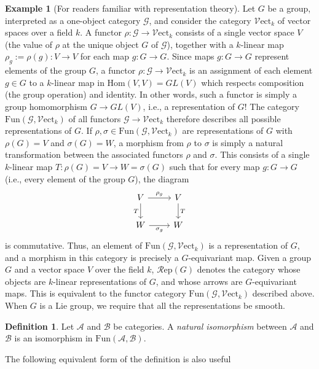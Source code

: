 \documentclass[10pt,oneside]{book}
\def\~#1{\mathscr{#1}}
\newcommand{\Hom}{\mathrm{Hom}}
\newcommand{\Fun}{\mathrm{Fun}}
\newcommand{\Vect}{\~V\mathrm{ect}}
\newcommand{\Rep}{\~R\mathrm{ep}}
\theoremstyle{plain}
\theoremstyle{definition}
\newtheorem{defn}[thm]{Definition}
\newtheorem{ex}[thm]{Example}
\theoremstyle{remark}
\numberwithin{equation}{section}
\numberwithin{figure}{section}
\begin{document}
\begin{ex}[For readers familiar with representation theory]
Let $G$ be a group, interpreted as a one-object category $\~G$, and consider the category $\Vect_k$ of vector spaces over a field $k$. A functor $\rho: \~G \to \Vect_k$ consists of a single vector space $V$ (the value of $\rho$ at the unique object $G$ of $\~G$), together with a $k$-linear map $\rho_g := \rho(g): V \to V$ for each map $g: G \to G$. Since maps $g: G \to G$ represent elements of the group $G$, a functor $\rho: \~G \to \Vect_k$ is an assignment of each element $g \in G$ to a $k$-linear map in $\Hom(V, V) = GL(V)$ which respects composition (the group operation) and identity. In other words, such a functor is simply a group homomorphism $G \to GL(V)$, i.e., a representation of $G$! The category $\Fun(\~G, \Vect_k)$ of all functors $\~G \to \Vect_k$ therefore describes all possible representations of $G$. If $\rho, \sigma \in \Fun(\~G, \Vect_k)$ are representations of $G$ with $\rho(G) = V$ and $\sigma(G) = W$, a morphism from $\rho$ to $\sigma$ is simply a natural transformation between the associated functors $\rho$ and $\sigma$. This consists of a single $k$-linear map $T: \rho(G) = V \to W = \sigma(G)$ such that for every map $g: G \to G$ (i.e., every element of the group $G$), the diagram
\[\begin{tikzcd}
    {V} & {V} \\
    {W} & {W}
    \arrow["{T}"', from=1-1, to=2-1]
    \arrow["{T}", from=1-2, to=2-2]
    \arrow["{\rho_g}", from=1-1, to=1-2]
    \arrow["{\sigma_g}"', from=2-1, to=2-2]
\end{tikzcd}\]
is commutative. Thus, an element of $\Fun(\~G, \Vect_k)$ is a representation of $G$, and a morphism in this category is precisely a $G$-equivariant map. Given a group $G$ and a vector space $V$ over the field $k$, $\Rep(G)$ denotes the category whose objects are $k$-linear representations of $G$, and whose arrows are $G$-equivariant maps. This is equivalent to the functor category $\Fun(\~G, \Vect_k)$ described above. When $G$ is a Lie group, we require that all the representations be smooth.
\end{ex}

\begin{defn}
    Let $\~A$ and $\~B$ be categories. A \emph{natural isomorphism} between $\~A$ and $\~B$ is an isomorphism in $\Fun(\~A, \~B)$. 
\end{defn}

The following equivalent form of the definition is also useful
\end{document}
